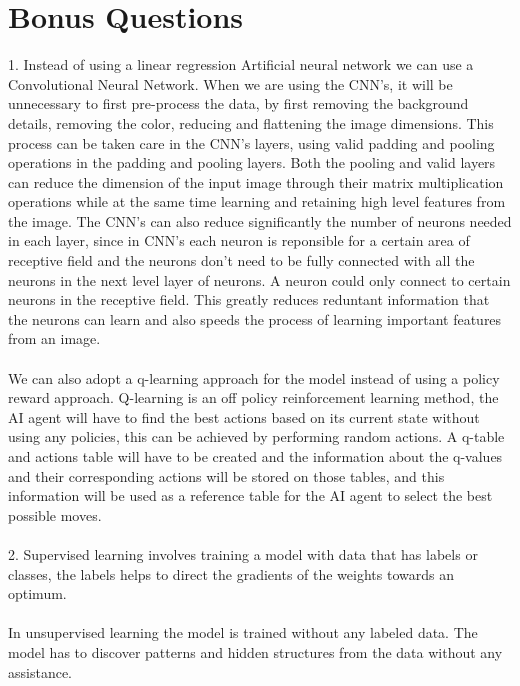 \documentclass[12pt,a4paper]{article}
\begin{document}
\section{Bonus Questions}


1. Instead of using a linear regression Artificial neural network we can use a Convolutional Neural Network. When we are using the CNN's, it will be unnecessary to first pre-process the data, by first removing the background details, removing the color, reducing and flattening the image dimensions. This process can be taken care in the CNN's layers, using valid padding and pooling operations in the  padding and pooling layers. Both the pooling and valid layers can reduce the dimension of the input image through their matrix multiplication operations while at the same time learning and retaining high level features from the image. The CNN's can also reduce significantly the number of neurons needed in each layer, since in CNN's each neuron is reponsible for a certain area of receptive field and the neurons don't need to be fully connected with all the neurons in the next level layer of neurons. A neuron could only connect to certain neurons in the receptive field. This greatly reduces reduntant information that the neurons can learn and also speeds the process of learning important features from an image.\\
\\
\noindent We can also adopt a q-learning approach for the model instead of using a policy reward approach. Q-learning is an off policy reinforcement learning method, the AI agent will have to find the best actions based on its current state without using any policies, this can be achieved by performing random actions. A q-table and actions table will have to be created and the information about the q-values and their corresponding actions will be stored on those tables, and this information will be used as a reference table for the AI agent to select the best possible moves. \\
\\
2. Supervised learning involves training a model with data that has labels or classes, the labels helps to direct the gradients of the weights towards an optimum.\\
\\
\noindent In unsupervised learning the model is trained without any labeled data. The model has to discover patterns and hidden structures from the data without any assistance.\\
\\
\end{document}
